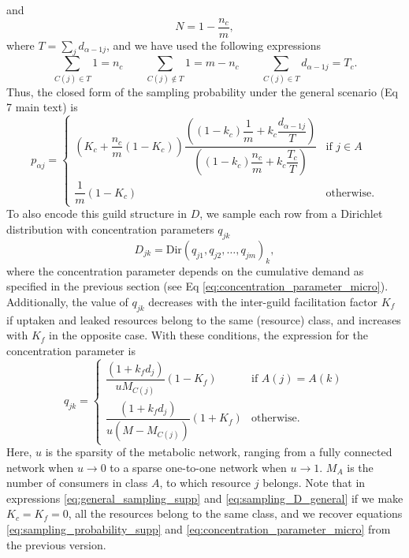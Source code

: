 \documentclass[12pt]{article}
\begin{document}
and 
\begin{equation*}
     N = 1-\frac{n_c}{m},
\end{equation*}
where $T = \sum_{j}d_{{\alpha}-1 j}$, and we have used the following expressions
\begin{equation*}
    \sum\limits_{C(j) \in T} 1 = n_c \qquad \sum\limits_{C(j) \not\in T} 1 = m - n_c \qquad \sum\limits_{C(j) \in T} d_{\alpha - 1 j} = T_c.
\end{equation*}
Thus, the closed form of the sampling probability under the general scenario (Eq 7 main text) is
\begin{equation}\label{eq:general_sampling_supp}
    p_{\alpha j} = 
     \begin{cases}
        \left(K_c + \dfrac{n_c}{m}(1-K_c)\right) \dfrac{ \left((1-k_c) \dfrac{1}{m}  + k_c \dfrac{d_{\alpha -1j} }{T}\right)}{\left((1-k_c) \dfrac{n_c}{m}  + k_c \dfrac{T_c}{T}\right)} & \text{if } j \in A \\[10pt]
        \dfrac{1}{m}(1-K_c) & \text{otherwise.}
     \end{cases}
\end{equation}
To also encode this guild structure in $D$, we sample each row from a Dirichlet distribution with concentration parameters $q_{jk}$
\begin{equation*}
    D_{jk} = \text{Dir}\left(q_{j1}, q_{j2}, \dots  , q_{jm}\right)_k , 
\end{equation*}
where the concentration parameter depends on the cumulative demand as specified in the previous section (see Eq \ref{eq:concentration_parameter_micro}). Additionally, the value of $q_{jk}$ decreases with the inter-guild facilitation factor $K_f$ if uptaken and leaked resources belong to the same (resource) class, and increases with $K_f$ in the opposite case. With these conditions, the expression for the concentration parameter is
\begin{equation}\label{eq:sampling_D_general}
    q_{jk} = 
    \begin{cases}
        \dfrac{(1 + k_f d_j)}{u M_{C(j)}}(1 - K_f) & \text{if } A(j) = A(k) \\
        \dfrac{(1 + k_f d_j)}{u (M-M_{C(j)})}(1 + K_f) & \text{otherwise.}
    \end{cases}
\end{equation}
Here, $u$ is the sparsity of the metabolic network, ranging from a fully connected network when $u \rightarrow 0$ to a sparse one-to-one network when $u \rightarrow 1$. $M_{A}$ is the number of consumers in class $A$, to which resource $j$ belongs.
Note that in expressions \ref{eq:general_sampling_supp} and \ref{eq:sampling_D_general} if we make $K_c = K_f = 0$, all the resources belong to the same class, and we recover equations \ref{eq:sampling_probability_supp} and \ref{eq:concentration_parameter_micro} from the previous version. 
\end{document}
